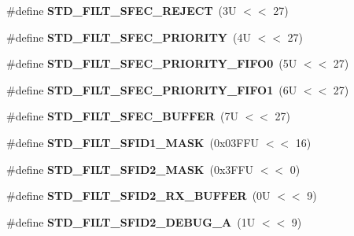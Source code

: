 \begin{DoxyCompactItemize}
\item 
\mbox{\label{group__can__module_ga5084195d36aa795d77dc70cccf860e5f}} 
\#define {\bfseries S\+T\+D\+\_\+\+F\+I\+L\+T\+\_\+\+S\+F\+E\+C\+\_\+\+R\+E\+J\+E\+CT}~(3\+U $<$$<$ 27)
\item 
\mbox{\label{group__can__module_gaabd35d44dce4c22ab3acfdb74f02ba8f}} 
\#define {\bfseries S\+T\+D\+\_\+\+F\+I\+L\+T\+\_\+\+S\+F\+E\+C\+\_\+\+P\+R\+I\+O\+R\+I\+TY}~(4\+U $<$$<$ 27)
\item 
\mbox{\label{group__can__module_ga0ace194b4e16ac842d1e990e2e495c0f}} 
\#define {\bfseries S\+T\+D\+\_\+\+F\+I\+L\+T\+\_\+\+S\+F\+E\+C\+\_\+\+P\+R\+I\+O\+R\+I\+T\+Y\+\_\+\+F\+I\+F\+O0}~(5\+U $<$$<$ 27)
\item 
\mbox{\label{group__can__module_gacf954a302fa19da5dc01475ed9753490}} 
\#define {\bfseries S\+T\+D\+\_\+\+F\+I\+L\+T\+\_\+\+S\+F\+E\+C\+\_\+\+P\+R\+I\+O\+R\+I\+T\+Y\+\_\+\+F\+I\+F\+O1}~(6\+U $<$$<$ 27)
\item 
\mbox{\label{group__can__module_gab86f1056e33cddfecd481f4e11089e31}} 
\#define {\bfseries S\+T\+D\+\_\+\+F\+I\+L\+T\+\_\+\+S\+F\+E\+C\+\_\+\+B\+U\+F\+F\+ER}~(7\+U $<$$<$ 27)
\item 
\mbox{\label{group__can__module_ga1965ad0b7a7858fb0acd8c930e46ff04}} 
\#define {\bfseries S\+T\+D\+\_\+\+F\+I\+L\+T\+\_\+\+S\+F\+I\+D1\+\_\+\+M\+A\+SK}~(0x03\+F\+F\+U $<$$<$ 16)
\item 
\mbox{\label{group__can__module_gac27b6ebeeb088af6d538bd83d8cff45c}} 
\#define {\bfseries S\+T\+D\+\_\+\+F\+I\+L\+T\+\_\+\+S\+F\+I\+D2\+\_\+\+M\+A\+SK}~(0x3\+F\+F\+U $<$$<$ 0)
\item 
\mbox{\label{group__can__module_gaa5fcf6ccec713827fa2fbe881388dbbc}} 
\#define {\bfseries S\+T\+D\+\_\+\+F\+I\+L\+T\+\_\+\+S\+F\+I\+D2\+\_\+\+R\+X\+\_\+\+B\+U\+F\+F\+ER}~(0\+U $<$$<$ 9)
\item 
\mbox{\label{group__can__module_gaf91e3ed5d90dc610291f92e9293fd655}} 
\#define {\bfseries S\+T\+D\+\_\+\+F\+I\+L\+T\+\_\+\+S\+F\+I\+D2\+\_\+\+D\+E\+B\+U\+G\+\_\+A}~(1\+U $<$$<$ 9)
$$
\end{DoxyCompactItemize}
